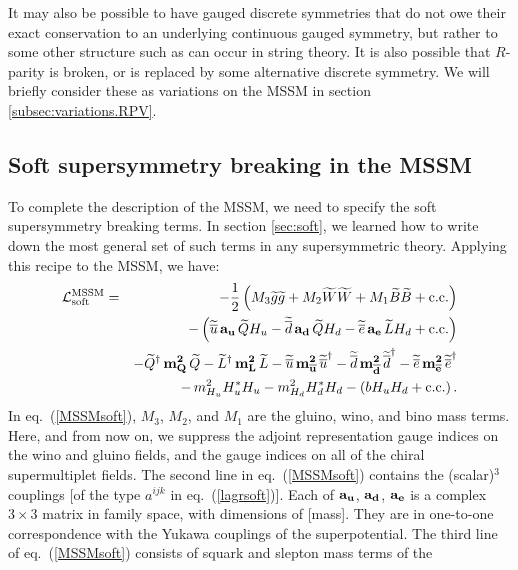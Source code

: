 \documentclass[11pt]{article}
\def\beq{\begin{eqnarray}}
\def\eeq{\end{eqnarray}}
\def\sbar{\overline}
\def\stilde{\widetilde}
\def\lagr{{\cal L}}
\def\conj{{{\rm c.c.}}}
\def\half{{1\over 2}}
\begin{document}
It may also be possible to have gauged discrete symmetries that do not owe
their exact conservation to an underlying continuous gauged symmetry, but
rather to some other structure such as can occur in string theory. It is
also possible that $R$-parity is broken, or is replaced by some
alternative discrete symmetry. We will briefly consider these as
variations on the MSSM in section \ref{subsec:variations.RPV}.

\subsection{Soft supersymmetry breaking in the
MSSM}\label{subsec:mssm.soft}
\setcounter{equation}{0}

To complete the description of the MSSM, we need to specify the soft
supersymmetry breaking terms. In section \ref{sec:soft}, we learned how to
write down the most general set of such terms in any supersymmetric
theory. Applying this recipe to the MSSM, we have: 
\beq
\lagr_{\rm soft}^{\rm MSSM} &=& -\half\left ( M_3 \stilde g\stilde g
+ M_2 \stilde W \stilde W + M_1 \stilde B\stilde B 
+\conj \right )
\nonumber
\\
&&
-\left ( \stilde {\sbar u} \,{\bf a_u}\, \stilde Q H_u
- \stilde {\sbar d} \,{\bf a_d}\, \stilde Q H_d
- \stilde {\sbar e} \,{\bf a_e}\, \stilde L H_d
+ \conj \right ) 
\nonumber
\\
&&
-\stilde Q^\dagger \, {\bf m^2_{Q}}\, \stilde Q
-\stilde L^\dagger \,{\bf m^2_{L}}\,\stilde L
-\stilde {\sbar u} \,{\bf m^2_{{\sbar u}}}\, {\stilde {\sbar u}}^\dagger
-\stilde {\sbar d} \,{\bf m^2_{{\sbar d}}} \, {\stilde {\sbar d}}^\dagger
-\stilde {\sbar e} \,{\bf m^2_{{\sbar e}}}\, {\stilde {\sbar e}}^\dagger
\nonumber \\
&&
- \, m_{H_u}^2 H_u^* H_u - m_{H_d}^2 H_d^* H_d
- \left ( b H_u H_d + \conj \right ) .
\label{MSSMsoft}
\eeq
In eq.~(\ref{MSSMsoft}), $M_3$, $M_2$, and $M_1$ are the gluino, wino, and
bino mass terms. Here, and from now on, we suppress the adjoint
representation gauge indices on the wino and gluino fields, and the gauge
indices on all of the chiral supermultiplet fields. The second line in
eq.~(\ref{MSSMsoft}) contains the (scalar)$^3$ couplings [of the type
$a^{ijk}$ in eq.~(\ref{lagrsoft})]. Each of ${\bf a_u}$, ${\bf a_d}$,
${\bf a_e}$ is a complex $3\times 3$ matrix in family space, with
dimensions of [mass]. They are in one-to-one correspondence with the
Yukawa couplings of the superpotential. The third line of
eq.~(\ref{MSSMsoft}) consists of squark and slepton mass terms of the
\end{document}
